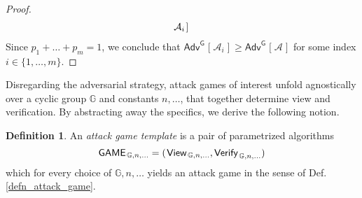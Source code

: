 \documentclass[psamsfonts, reqno]{amsart}
\theoremstyle{definition}
\newtheorem{defn}[thm]{Definition}
\theoremstyle{remark}
\numberwithin{equation}{section}
\begin{document}
\begin{proof}
\begin{equation*}
\begin{split}
			\mathcal{A}_i
			\hspace{1pt}
		]\hspace{1pt}\\[0pt]
\end{split}
\vspace{5pt}
\end{equation*}
Since $p_1 + \dots + p_m = 1$,
we conclude that
$
\mathsf{Adv}
	^{\mathsf{G}}
	\hspace{1pt}
	[
		\hspace{1pt}
		\mathcal{A}_i
		\hspace{1pt}
	]
\ge
\mathsf{Adv}
	^{\mathsf{G}}
	\hspace{1pt}
	[
		\hspace{1pt}
		\mathcal{A}
		\hspace{1pt}
	]
$
for some index $i \in \{1, \dots, m\}$.
\vspace{5pt}
\end{proof}

\noindent
Disregarding the adversarial strategy,
attack games of interest unfold
agnostically over a cyclic group $\mathbb{G}$
and constants $n, \dots$,
that together determine view and verification.
By abstracting away the specifics,
we derive the following notion.

\begin{defn}\label{attack_game_template_def}
An \textit{attack game template} is a pair
of parametrized algorithms
\vspace{5pt}
\begin{equation}\label{defn_attack_game_elaboration}
\mathsf{GAME}
	_{\hspace{1pt}\mathbb{G}, n, \dots}
=
(
	\hspace{1pt}
	\mathsf{View}
		_{\hspace{1pt}\mathbb{G}, n, \dots},
	\mathsf{Verify}
		_{\hspace{1pt}\mathbb{G}, n, \dots}
)
\vspace{5pt}
\end{equation}
which for every choice of
$\mathbb{G}, n, \dots$
yields an attack game in the sense of Def.
\ref{defn_attack_game}.
\end{defn}
\end{document}
